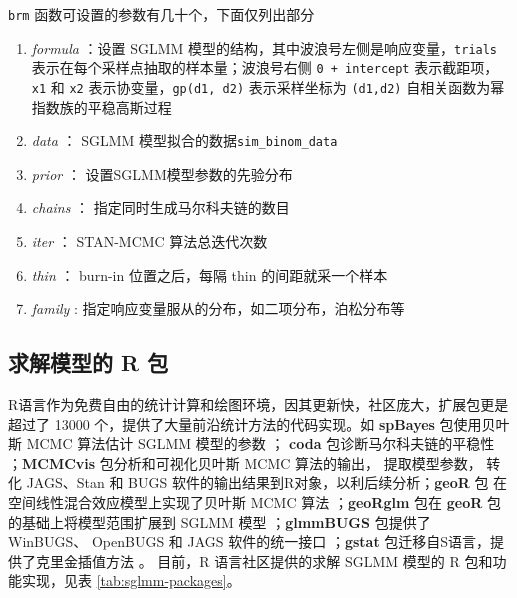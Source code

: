 \documentclass[12pt,a4paper,UTF8,twoside]{book}
\providecommand{\tightlist}{%
  \setlength{\itemsep}{0pt}\setlength{\parskip}{0pt}}
\theoremstyle{definition}
\theoremstyle{definition}
\theoremstyle{definition}
\theoremstyle{remark}
\begin{document}
\noindent \texttt{brm} 函数可设置的参数有几十个，下面仅列出部分

\begin{enumerate}
\def\labelenumi{\arabic{enumi}.}
\tightlist
\item
  \emph{formula} ：设置 SGLMM
  模型的结构，其中波浪号左侧是响应变量，\texttt{trials}
  表示在每个采样点抽取的样本量；波浪号右侧 \texttt{0\ +\ intercept}
  表示截距项， \texttt{x1} 和 \texttt{x2}
  表示协变量，\texttt{gp(d1,\ d2)} 表示采样坐标为 \texttt{(d1,d2)}
  自相关函数为幂指数族的平稳高斯过程
\item
  \emph{data} ： SGLMM 模型拟合的数据\texttt{sim\_binom\_data}
\item
  \emph{prior} ： 设置SGLMM模型参数的先验分布
\item
  \emph{chains} ： 指定同时生成马尔科夫链的数目
\item
  \emph{iter} ： STAN-MCMC 算法总迭代次数
\item
  \emph{thin} ： burn-in 位置之后，每隔 thin 的间距就采一个样本
\item
  \emph{family} : 指定响应变量服从的分布，如二项分布，泊松分布等
\end{enumerate}

\hypertarget{-r-}{%
\subsection{求解模型的 R 包}\label{-r-}}

R语言作为免费自由的统计计算和绘图环境，因其更新快，社区庞大，扩展包更是超过了
13000 个，提供了大量前沿统计方法的代码实现。如 \textbf{spBayes}
包使用贝叶斯 MCMC 算法估计 SGLMM 模型的参数 \citep{spBayes2015}；
\textbf{coda} 包诊断马尔科夫链的平稳性
\citep{coda2006}；\textbf{MCMCvis} 包分析和可视化贝叶斯 MCMC
算法的输出， 提取模型参数， 转化 JAGS、Stan 和 BUGS
软件的输出结果到R对象，以利后续分析；\textbf{geoR} 包
在空间线性混合效应模型上实现了贝叶斯 MCMC 算法
\citep{geoR2001}；\textbf{geoRglm} 包在 \textbf{geoR}
包的基础上将模型范围扩展到 SGLMM 模型
\citep{geoRglm2002}；\textbf{glmmBUGS} 包提供了 WinBUGS、 OpenBUGS 和
JAGS 软件的统一接口 \citep{glmmBUGS2010MCMC}；\textbf{gstat}
包迁移自S语言，提供了克里金插值方法 \citep{gstat2016}。 目前，R
语言社区提供的求解 SGLMM 模型的 R 包和功能实现，见表
\ref{tab:sglmm-packages}。
\end{document}
